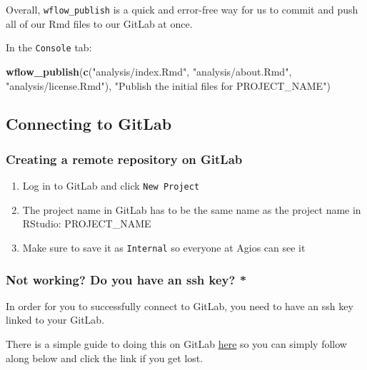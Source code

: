 \documentclass[openany]{book}
\newenvironment{Shaded}{\begin{snugshade}}{\end{snugshade}}
\newcommand{\KeywordTok}[1]{\textcolor[rgb]{0.13,0.29,0.53}{\textbf{#1}}}
\newcommand{\NormalTok}[1]{#1}
\newcommand{\StringTok}[1]{\textcolor[rgb]{0.31,0.60,0.02}{#1}}
\providecommand{\tightlist}{%
  \setlength{\itemsep}{0pt}\setlength{\parskip}{0pt}}
\begin{document}
Overall, \texttt{wflow\_publish} is a quick and error-free way for us to commit and push all of our Rmd files to our GitLab at once.

In the \texttt{Console} tab:

\begin{Shaded}
\begin{Highlighting}[]
\KeywordTok{wflow_publish}\NormalTok{(}\KeywordTok{c}\NormalTok{(}\StringTok{"analysis/index.Rmd"}\NormalTok{, }\StringTok{"analysis/about.Rmd"}\NormalTok{, }\StringTok{"analysis/license.Rmd"}\NormalTok{), }\StringTok{"Publish the initial files for PROJECT_NAME"}\NormalTok{)}
\end{Highlighting}
\end{Shaded}

\hypertarget{connecting-to-gitlab-1}{%
\subsection{Connecting to GitLab}\label{connecting-to-gitlab-1}}

\hypertarget{creating-a-remote-repository-on-gitlab}{%
\subsubsection{Creating a remote repository on GitLab}\label{creating-a-remote-repository-on-gitlab}}

\begin{enumerate}
\def\labelenumi{\arabic{enumi}.}
\tightlist
\item
  Log in to GitLab and click \texttt{New\ Project}
\item
  The project name in GitLab has to be the same name as the project name in RStudio: PROJECT\_NAME
\item
  Make sure to save it as \texttt{Internal} so everyone at Agios can see it
\end{enumerate}

\hypertarget{not-working-do-you-have-an-ssh-key}{%
\subsubsection*{Not working? Do you have an ssh key? *}\label{not-working-do-you-have-an-ssh-key}}

In order for you to successfully connect to GitLab, you need to have an ssh key linked to your GitLab.

There is a simple guide to doing this on GitLab \href{http://ceres.agios.com/help/ssh/README\#generating-a-new-ssh-key-pair}{here} so you can simply follow along below and click the link if you get lost.
\end{document}
